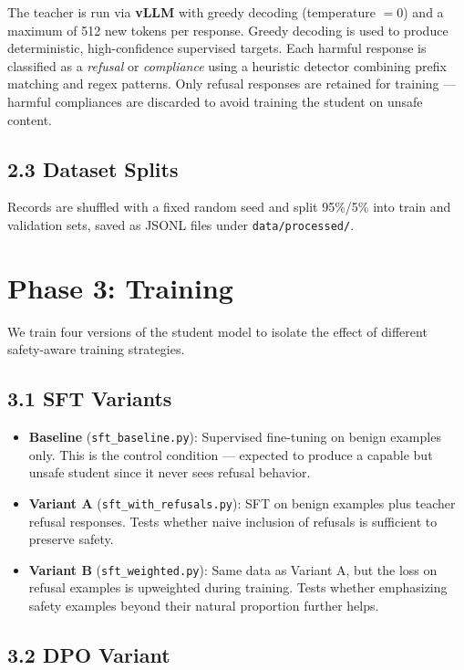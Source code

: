\documentclass[11pt]{article}
\begin{document}
The teacher is run via \textbf{vLLM} with greedy decoding (temperature $= 0$) and a maximum of 512 new tokens per response. Greedy decoding is used to produce deterministic, high-confidence supervised targets. Each harmful response is classified as a \emph{refusal} or \emph{compliance} using a heuristic detector combining prefix matching and regex patterns. Only refusal responses are retained for training --- harmful compliances are discarded to avoid training the student on unsafe content.

\subsection{2.3 Dataset Splits}

Records are shuffled with a fixed random seed and split 95\%/5\% into train and validation sets, saved as JSONL files under \texttt{data/processed/}.

\section{Phase 3: Training}

We train four versions of the student model to isolate the effect of different safety-aware training strategies.

\subsection{3.1 SFT Variants}

\begin{itemize}
    \item \textbf{Baseline} (\texttt{sft\_baseline.py}): Supervised fine-tuning on benign examples only. This is the control condition --- expected to produce a capable but unsafe student since it never sees refusal behavior.
    \item \textbf{Variant A} (\texttt{sft\_with\_refusals.py}): SFT on benign examples plus teacher refusal responses. Tests whether naive inclusion of refusals is sufficient to preserve safety.
    \item \textbf{Variant B} (\texttt{sft\_weighted.py}): Same data as Variant A, but the loss on refusal examples is upweighted during training. Tests whether emphasizing safety examples beyond their natural proportion further helps.
\end{itemize}

\subsection{3.2 DPO Variant}
\end{document}
